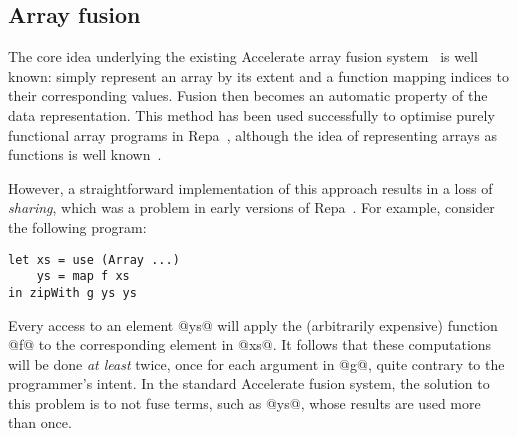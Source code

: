 \subsection{Array fusion}

The core idea underlying the existing Accelerate array fusion system~\cite{McDonell:acc-optim} is well known: simply represent an array by its extent and a function mapping indices to their corresponding values. Fusion then becomes an automatic property of the data representation. This method has been used successfully to optimise purely functional array programs in
Repa~\cite{Keller:Repa,Lippmeier:Guiding}, although the idea of representing arrays as functions is well known~\cite{Claessen:obsidian-expressive,Guibas:1978jh,Elliott:2003ug}.



However, a straightforward implementation of this approach results in a loss of \emph{sharing}, which was a problem in early versions of Repa~\cite{Lippmeier:Guiding}. For example, consider the following program:
%
\begin{lstlisting}
let xs = use (Array ...)
    ys = map f xs
in zipWith g ys ys
\end{lstlisting}
%
Every access to an element @ys@ will apply the (arbitrarily expensive) function @f@ to the corresponding element in @xs@. It follows that these computations will be done \emph{at least} twice, once for each argument in @g@, quite contrary to the programmer's intent. In the standard Accelerate fusion system, the solution to this problem is to not fuse terms, such as @ys@, whose results are used more than once.


